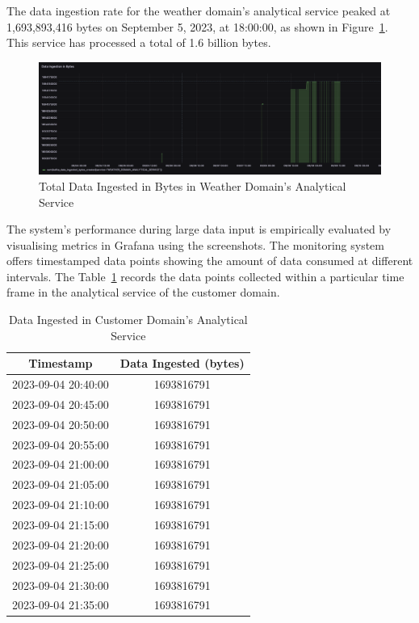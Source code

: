 \documentclass[journal]{IEEEtran}
\begin{document}
The data ingestion rate for the weather domain's analytical service peaked at 1,693,893,416 bytes on September 5, 2023, at 18:00:00, as shown in Figure~\ref{totalDataIngestedinBytesInWeatherDomainsAnalyticalService}. This service has processed a total of 1.6 billion bytes.

\begin{figure}[h]
  \centering
  \includegraphics[width=\textwidth]{images/weather-domain-ingested-data-in-bytes.png}
  \caption{Total Data Ingested in Bytes in Weather Domain's Analytical Service}
  \label{totalDataIngestedinBytesInWeatherDomainsAnalyticalService}
\end{figure}

The system's performance during large data input is empirically evaluated by visualising metrics in Grafana using the screenshots. The monitoring system offers timestamped data points showing the amount of data consumed at different intervals. The Table~\ref{dataIngestedInCustomerDomainAnalyticalServiceTable} records the data points collected within a particular time frame in the analytical service of the customer domain.


\begin{table}[ht]
  \centering
  \caption{Data Ingested in Customer Domain's Analytical Service}
  \begin{tabular}{|c|c|}
  \hline
  \textbf{Timestamp} & \textbf{Data Ingested (bytes)} \\
  \hline
  2023-09-04 20:40:00 & 1693816791 \\
  2023-09-04 20:45:00 & 1693816791 \\
  2023-09-04 20:50:00 & 1693816791 \\
  2023-09-04 20:55:00 & 1693816791 \\
  2023-09-04 21:00:00 & 1693816791 \\
  2023-09-04 21:05:00 & 1693816791 \\
  2023-09-04 21:10:00 & 1693816791 \\
  2023-09-04 21:15:00 & 1693816791 \\
  2023-09-04 21:20:00 & 1693816791 \\
  2023-09-04 21:25:00 & 1693816791 \\
  2023-09-04 21:30:00 & 1693816791 \\
  2023-09-04 21:35:00 & 1693816791 \\
  \hline
  \end{tabular}
  \label{dataIngestedInCustomerDomainAnalyticalServiceTable}
\end{table}
\end{document}
